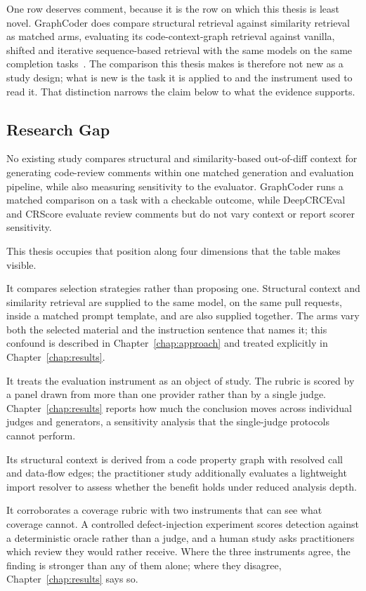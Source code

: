 One row deserves comment, because it is the row on which this thesis is least
novel. GraphCoder does compare structural retrieval against similarity retrieval
as matched arms, evaluating its code-context-graph retrieval against vanilla,
shifted and iterative sequence-based retrieval with the same models on the same
completion tasks~\cite{liu2024graphcoder}. The comparison this thesis makes is
therefore not new as a study design; what is new is the task it is applied to and
the instrument used to read it. That distinction narrows the claim below to
what the evidence supports.

\subsection*{Research Gap}

No existing study compares structural and similarity-based out-of-diff context
for generating code-review comments within one matched generation and
evaluation pipeline, while also measuring sensitivity to the evaluator.
GraphCoder runs a matched comparison on a task with a checkable outcome, while
DeepCRCEval and CRScore evaluate review comments but do not vary context or
report scorer sensitivity.

This thesis occupies that position along four dimensions that the table makes
visible.

It compares selection strategies rather than proposing one. Structural context and
similarity retrieval are supplied to the same model, on the same pull requests,
inside a matched prompt template, and are also supplied together. The arms vary
both the selected material and the instruction sentence that names it; this
confound is described in Chapter~\ref{chap:approach} and treated explicitly in
Chapter~\ref{chap:results}.

It treats the evaluation instrument as an object of study. The rubric is scored by
a panel drawn from more than one provider rather than by a single judge.
Chapter~\ref{chap:results} reports how much the conclusion moves across
individual judges and generators, a sensitivity analysis that the
single-judge protocols cannot perform.

Its structural context is derived from a code property graph with resolved
call and data-flow edges; the practitioner study additionally evaluates a
lightweight import resolver to assess whether the benefit holds under reduced
analysis depth.

It corroborates a coverage rubric with two instruments that can see what coverage
cannot. A controlled defect-injection experiment scores detection against a
deterministic oracle rather than a judge, and a human study asks practitioners
which review they would rather receive. Where the three instruments
agree, the finding is stronger than any of them alone; where they disagree,
Chapter~\ref{chap:results} says so.
